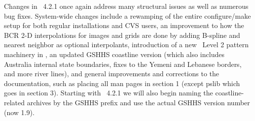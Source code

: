 Changes in \GMT\ 4.2.1 once again address many structural issues as well as numerous bug fixes.
System-wide changes include a rewamping of the entire configure/make setup for both regular
installations and CVS users, an improvement to how the BCR 2-D interpolations for images and grids
are done by adding B-spline and nearest neighbor as optional interpolants, introduction of
a new \PS\ Level 2 pattern machinery in , an updated GSHHS coastline version (which
also includes Australia internal state
boundaries, fixes to the Yemeni and Lebanese borders, and more river lines), and general
improvements and corrections to the documentation, such as placing all man pages in section 1
(except pslib which goes in section 3). Starting with \GMT\ 4.2.1 we will also begin naming
the coastline-related archives by the GSHHS prefix and use the actual GSHHS version number (now
1.9).

